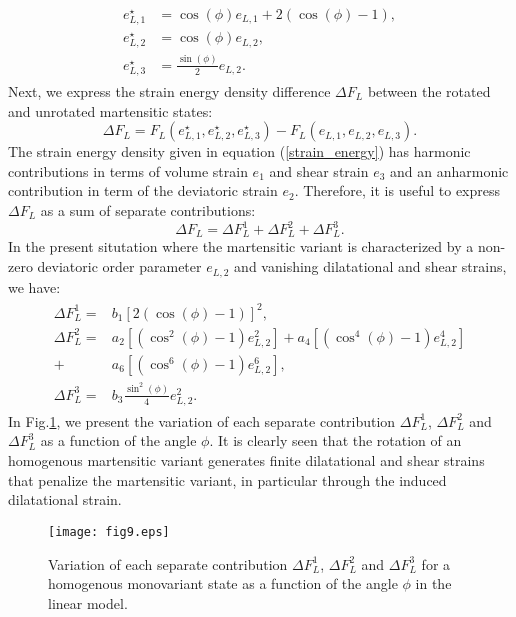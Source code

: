 \documentclass[twocolumn,amsmath,amssymb]{revtex4}
\begin{document}
\begin{align}
\begin{split}
e^{\star}_{L,1}&{}	 = \cos(\phi)e_{L,1}+2(\cos(\phi)-1),\\
e_{L,2}^{\star}&{}    =\cos(\phi)e_{L,2},\\
e_{L,3}^{\star}&{}	=\frac{\sin(\phi)}{2}e_{L,2}.
\end{split}
\end{align} 
Next, we   express the  strain energy density difference $\Delta F_L$ between the rotated and unrotated martensitic states: 
\begin{equation}
\Delta F_L = F_{L}(e^{\star}_{L,1},e^{\star}_{L,2},e^{\star}_{L,3}) - F_{L}(e_{L,1},e_{L,2},e_{L,3}).
\end{equation}
The strain energy density  given in  equation (\ref{strain_energy}) has harmonic contributions in terms of  volume strain $e_1$ and  shear strain $e_3$ and an anharmonic contribution in term of the deviatoric strain $e_2$. Therefore, it is useful to express $\Delta F_L$ as a sum of separate contributions:
\begin{equation}
\Delta F_L = \Delta F_L^1 + \Delta F_L^2  + \Delta F_L^3.
\end{equation}
In the present situtation where the martensitic variant is characterized by a non-zero deviatoric order parameter     $e_{L,2}$ and vanishing dilatational and shear strains, we have:
\begin{align}
\begin{split}
\Delta F_L^1	 = &{}b_1[2(\cos(\phi)-1)]^2,\\
\Delta F_L^2 	 = &{}a_2[(\cos^2(\phi)-1)e^2_{L,2}]
+ a_4[(\cos^4(\phi)-1)e^4_{L,2}]\\+ &{}a_6[(\cos^6(\phi)-1)e^6_{L,2}],\\
\Delta F_L^3	 = &{}b_3\frac{\sin^2(\phi)}{4}e^2_{L,2}.
\end{split}
\end{align}  
%
In Fig.\ref{variationL}, we present  the variation of each separate contribution $\Delta F_{L}^1$, $\Delta F_{L}^2$ and $\Delta F_{L}^3$ as a function of the angle $\phi$. It is clearly seen that the rotation of an homogenous  martensitic variant generates finite dilatational and shear strains that penalize the martensitic variant, in particular through the induced dilatational strain.
\begin{figure}
\texttt{[image: fig9.eps]}
\caption{\label{variationL}    Variation of each separate contribution $\Delta F_{L}^1$, $\Delta F_{L}^2$ and $\Delta F_{L}^3$  for a homogenous monovariant state  as a function of the  angle $\phi$ in the linear model.}
\end{figure}
\end{document}
